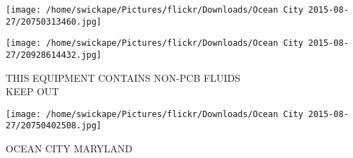 \documentclass[10pt,letterpaper]{article}
\begin{document}
\texttt{[image: /home/swickape/Pictures/flickr/Downloads/Ocean City 2015-08-27/20750313460.jpg]}

\vspace{0.25in}
\texttt{[image: /home/swickape/Pictures/flickr/Downloads/Ocean City 2015-08-27/20928614432.jpg]}

THIS EQUIPMENT CONTAINS NON{-}PCB FLUIDS\\
KEEP OUT\\
\pagebreak

\texttt{[image: /home/swickape/Pictures/flickr/Downloads/Ocean City 2015-08-27/20750402508.jpg]}

OCEAN CITY MARYLAND\\
\pagebreak
\end{document}
